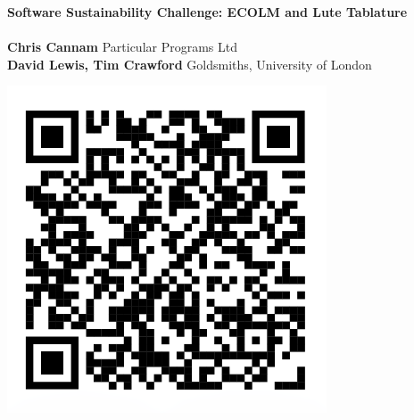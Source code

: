 \documentclass[a0,landscape]{a0poster}
\begin{document}
\begin{minipage}[b]{0.9\linewidth}
\veryHuge \textbf{Software Sustainability Challenge: ECOLM and Lute Tablature}\\
\\[1cm]
\huge \textbf{Chris Cannam} Particular Programs Ltd\\
\textbf{David Lewis, Tim Crawford} Goldsmiths, University of London\\
\end{minipage}
%
\begin{minipage}[b]{0.1\linewidth}
  \includegraphics[]{images/qr}\\
\end{minipage}

\vspace{1cm} %

\end{document}
